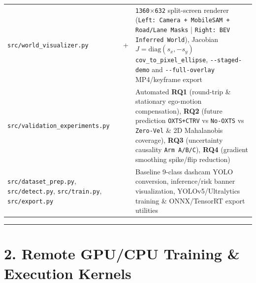 \documentclass[10.5pt,a4paper]{article}
\begin{document}
\begin{footnotesize}
\begin{longtable}{>{\raggedright\arraybackslash}p{} >{\raggedright\arraybackslash}p{} >{\raggedright\arraybackslash}p{}}
\texttt{src/\allowbreak{}world\_\allowbreak{}visualizer.\allowbreak{}py} & 710+ & \texttt{1360$\times$632} split-screen renderer (\texttt{Left:\allowbreak{} Camera + MobileSAM + Road/\allowbreak{}Lane Masks} | \texttt{Right:\allowbreak{} BEV Inferred World}), Jacobian $J=\text{diag}(s_x,-s_y)$ \texttt{cov\_\allowbreak{}to\_\allowbreak{}pixel\_\allowbreak{}ellipse}, \texttt{-\allowbreak{}-\allowbreak{}staged-\allowbreak{}demo} and \texttt{-\allowbreak{}-\allowbreak{}full-\allowbreak{}overlay} MP4/keyframe export \\
\texttt{src/\allowbreak{}validation\_\allowbreak{}experiments.\allowbreak{}py} & 499 & Automated \textbf{RQ1} (round-trip \& stationary ego-motion compensation), \textbf{RQ2} (future prediction \texttt{OXTS+CTRV} vs \texttt{No-\allowbreak{}OXTS} vs \texttt{Zero-\allowbreak{}Vel} \& 2D Mahalanobis coverage), \textbf{RQ3} (uncertainty causality \texttt{Arm A/\allowbreak{}B/\allowbreak{}C}), \textbf{RQ4} (gradient smoothing spike/flip reduction) \\
\texttt{src/\allowbreak{}dataset\_\allowbreak{}prep.\allowbreak{}py}, \texttt{src/\allowbreak{}detect.\allowbreak{}py}, \texttt{src/\allowbreak{}train.\allowbreak{}py}, \texttt{src/\allowbreak{}export.\allowbreak{}py} & 377 & Baseline 9-class dashcam YOLO conversion, inference/risk banner visualization, YOLOv5/Ultralytics training \& ONNX/TensorRT export utilities \\
\end{longtable}
\end{footnotesize}


\par\noindent\rule{\textwidth}{0.4pt}\par\medskip

\section{2. Remote GPU/CPU Training \& Execution Kernels}
\end{document}
